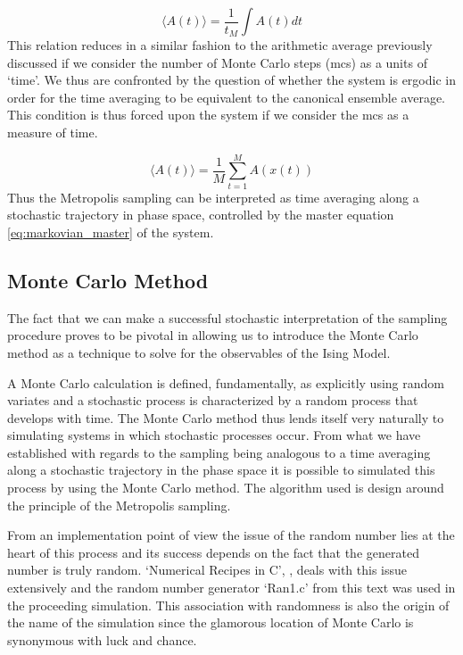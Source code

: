 \documentclass[a4paper]{article}
\newcommand{\bra}{\langle}
\newcommand{\ket}{\rangle}
\begin{document}
\begin{equation}
  \bra A(t) \ket = \frac{1}{t_M} \int A(t) dt\label{eq:temp_average} 
\end{equation}
This relation reduces in a similar fashion to the arithmetic average previously discussed
if we consider the number of Monte Carlo steps (mcs) as  a units of
`time'. We thus are confronted by the question of whether the system
is ergodic in order for the time averaging to be equivalent to the
canonical ensemble average. This condition is thus forced upon the
system if we consider the mcs as a measure of time.

\begin{equation}
  \bra A(t) \ket =\frac{1}{M}\sum_{t=1}^{M}A(x(t)) 
  \label{eq:discreet_temp_avg}
\end{equation}
Thus the Metropolis sampling can be interpreted as time averaging along
a stochastic trajectory in phase space, controlled by the master equation
\eqref{eq:markovian_master} of the system. 

\subsection{Monte Carlo Method}

The fact that we can make a successful stochastic interpretation of
the sampling procedure 
proves to be pivotal in allowing us to introduce the Monte Carlo method
as a technique to solve for the observables of the Ising Model.

A Monte Carlo calculation is defined, fundamentally, as explicitly
using random variates and a stochastic process is characterized by a random 
process that develops with time. The Monte Carlo method thus lends
itself very naturally to simulating systems in which stochastic
processes occur. From what we have established with
regards to the sampling being analogous to a time averaging along a
stochastic trajectory in the phase space it is possible to simulated
this process by using the Monte Carlo method. The algorithm used is
design around the principle of the Metropolis sampling.

From an implementation point of view the issue of the random number lies
at the heart of this process and its success depends on the fact that
the generated number is truly random. %
`Numerical Recipes in C', \cite{NumRecipe}, deals with this issue
extensively and the random number generator `Ran1.c' from this text
was used in the proceeding simulation. This association with
randomness is also the origin of the name of the simulation since the
glamorous location of Monte Carlo is synonymous with luck and chance. 
\end{document}
